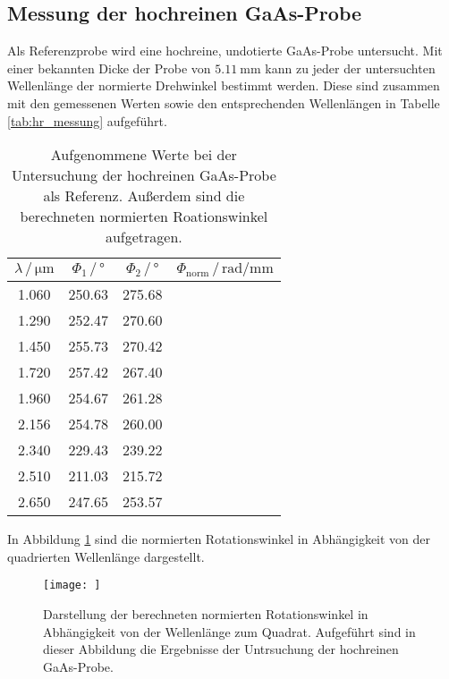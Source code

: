  \subsection{Messung der hochreinen GaAs-Probe}
 Als Referenzprobe wird eine hochreine, undotierte GaAs-Probe untersucht.
 Mit einer bekannten Dicke der Probe von $\SI{5.11}{\milli\meter}$ kann zu jeder der untersuchten 
 Wellenlänge der normierte Drehwinkel bestimmt werden. Diese sind zusammen mit den gemessenen Werten sowie den 
 entsprechenden Wellenlängen in Tabelle \ref{tab:hr_messung} aufgeführt.
 \begin{table}[H]
    \centering
    \caption{Aufgenommene Werte bei der Untersuchung der hochreinen GaAs-Probe als Referenz. Außerdem sind die 
    berechneten normierten Roationswinkel aufgetragen.}
    \label{tab:MF_Messung}
    \begin{tabular}{cccc}
      \toprule
      $\lambda\, / \, \si{\micro\meter}$ & $\Phi_1 \, / \, \si{\degree}$ & $\Phi_2 \, / \, \si{\degree}$ & $\Phi_\text{norm} \, / \, \si{\radian\per\milli\meter}$  \\
      \midrule
      1.060 & 250.63 & 275.68 &  \\
      1.290 & 252.47 & 270.60 &  \\
      1.450 & 255.73 & 270.42 &  \\
      1.720 & 257.42 & 267.40 &  \\
      1.960 & 254.67 & 261.28 &  \\
      2.156 & 254.78 & 260.00 &  \\
      2.340 & 229.43 & 239.22 &  \\
      2.510 & 211.03 & 215.72 &  \\
      2.650 & 247.65 & 253.57 &  \\
      \bottomrule
    \end{tabular}
   \end{table} \noindent
   In Abbildung \ref{fig:hr_Messung} sind die normierten Rotationswinkel in Abhängigkeit von der quadrierten 
   Wellenlänge dargestellt. 
   \begin{figure}[H]
       \centering
       \texttt{[image: ]}
       \caption{Darstellung der berechneten normierten Rotationswinkel in Abhängigkeit von der Wellenlänge 
       zum Quadrat. Aufgeführt sind in dieser Abbildung die Ergebnisse der Untrsuchung der hochreinen GaAs-Probe. }
       \label{fig:hr_Messung}
   \end{figure}

